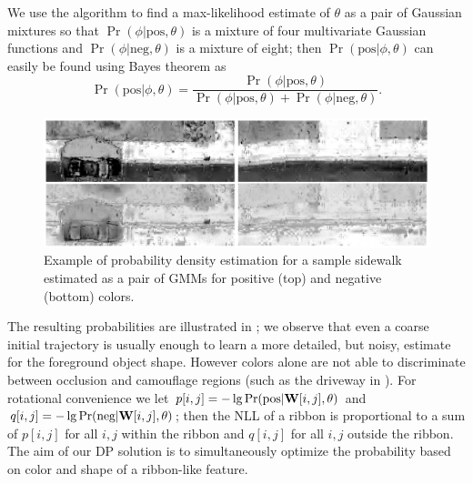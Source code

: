 
We use the  algorithm to find a max-likelihood estimate of $\theta$ as a pair of Gaussian mixtures so that $\Pr(\phi|\text{pos}, \theta)$ is a mixture of four multivariate Gaussian functions and $\Pr(\phi|\text{neg}, \theta)$ is a mixture of eight; then $\Pr(\text{pos}|\phi, \theta)$ can easily be found using Bayes theorem as 
$$\Pr(\text{pos}|\phi, \theta)= \frac{\Pr(\phi|\text{pos}, \theta)}{\Pr(\phi|\text{pos}, \theta)+\Pr(\phi|\text{neg}, \theta)}.$$


\begin{figure}[htb]
    \centering
    \includegraphics[width=0.95\columnwidth]{Figures/GMM_needed.pdf}
    \caption[\ac{GMM} Result]{Example of probability density estimation for a sample sidewalk estimated as a pair of \acp{GMM} for positive (top) and negative (bottom) colors.}
    \label{fig:GMM_result}
\end{figure}

\FloatBarrier

The resulting probabilities are illustrated in ; we observe that even a coarse initial trajectory is usually enough to learn a more detailed, but noisy, estimate for the foreground object shape. However colors alone are not able to discriminate between occlusion and camouflage regions (such as the driveway in ). For rotational convenience we let $p[i,j]=-\lg \Pr(\text{pos}|\mathbf{W}{}[i,j], \theta)$ and $q[i,j]=-\lg \Pr(\text{neg}|\mathbf{W}{}[i,j], \theta)$; then the \ac{NLL} of a ribbon is proportional to a sum of $p[i,j]$ for all $i,j$ within the ribbon and $q[i,j]$ for all $i,j$ outside the ribbon. The aim of our \ac{DP} solution is to simultaneously optimize the probability based on color and shape of a ribbon-like feature. 


